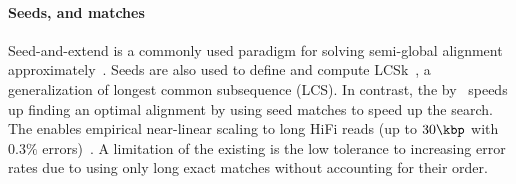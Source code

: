\paragraph{Seeds, and matches}

Seed-and-extend is a commonly used paradigm for solving semi-global
alignment approximately~\citep{kucherov2019evolution}.
Seeds are also used to define and compute LCSk~\citep{benson2014longest}, a
generalization of longest common subsequence (LCS). In contrast, the \emph{\sh}
by~\citet{ivanov2022fast} speeds up finding an optimal alignment by
using seed matches to speed up the \A search. The \sh enables
empirical near-linear scaling to long HiFi reads (up to $30\kbp$ with $0.3\%$
errors)~\citep{ivanov2022fast}. A limitation of the existing \sh is the low
tolerance to increasing error rates due to using only long exact matches without
accounting for their order.